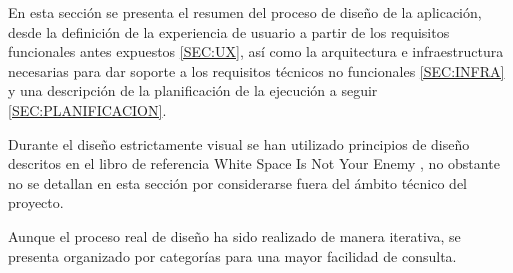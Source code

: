 
En esta sección se presenta el resumen del proceso de diseño de la aplicación, desde la definición de la experiencia de usuario a partir de los requisitos funcionales antes expuestos \ref{SEC:UX}, así como la arquitectura e infraestructura necesarias para dar soporte a los requisitos técnicos no funcionales \ref{SEC:INFRA} y una descripción de la planificación de la ejecución a seguir \ref{SEC:PLANIFICACION}.

Durante el diseño estrictamente visual se han utilizado principios de diseño descritos en el libro de referencia White Space Is Not Your Enemy \cite{WhiteSpace}, no obstante no se detallan en esta sección por considerarse fuera del ámbito técnico del proyecto.

Aunque el proceso real de diseño ha sido realizado de manera iterativa, se presenta organizado por categorías para una mayor facilidad de consulta.
